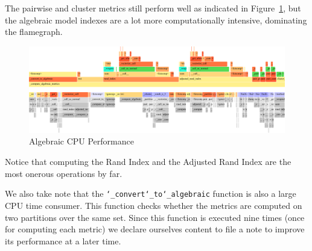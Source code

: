 \documentclass{article}
\begin{document}
    The pairwise and cluster metrics still perform well as indicated in
    Figure~\ref{appendix:fig:alg-cpu-perf}, but the algebraic model indexes are
    a lot more computationally intensive, dominating the flamegraph.

    \begin{figure}[htbp]
        \includegraphics[width=\textwidth]{performance/algebraic-flamegraph}
        \caption{Algebraic CPU Performance}\label{appendix:fig:alg-cpu-perf}
    \end{figure}

    Notice that computing the Rand Index and the Adjusted Rand Index are the
    most onerous operations by far.

    We also take note that the \texttt{\char`_convert\char`_to\char`_algebraic}
    function is also a large CPU time consumer.
    This function checks whether the metrics are computed on two partitions over
    the same set.
    Since this function is executed nine times (once for computing each metric)
    we declare ourselves content to file a note to improve its performance at a
    later time.


{
    \small
    
}
\end{document}
